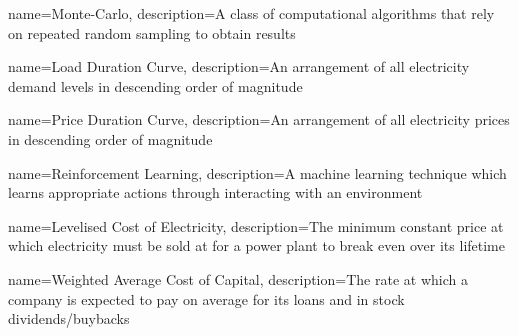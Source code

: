 {
	name=Monte-Carlo,
	description={A class of computational algorithms that rely on repeated random sampling to obtain results}
}



{
	name=Load Duration Curve,
	description={An arrangement of all electricity demand levels in descending order of magnitude}
}




{
	name=Price Duration Curve,
	description={An arrangement of all electricity prices in descending order of magnitude}
}




{
	name=Reinforcement Learning,
	description={A machine learning technique which learns appropriate actions through interacting with an environment}
}



{
	name=Levelised Cost of Electricity,
	description={The minimum constant price at which electricity must be sold at for a power plant to break even over its lifetime}
}




{
	name=Weighted Average Cost of Capital,
	description={The rate at which a company is expected to pay on average for its loans and in stock dividends/buybacks}
}




